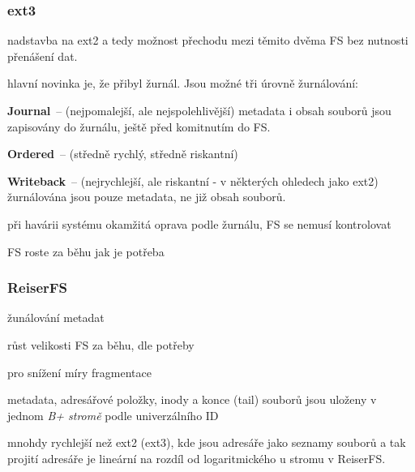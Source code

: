 \subsubsection*{ext3}
\begin{pitemize}
  \item nadstavba na ext2 a tedy možnost přechodu mezi těmito dvěma FS bez
  nutnosti přenášení dat.
  \item hlavní novinka je, že přibyl žurnál. Jsou možné tři úrovně žurnálování:
  \begin{pitemize}
    \item \textbf{Journal}~-- (nejpomalejší, ale nejspolehlivější) metadata i
    obsah souborů jsou zapisovány do žurnálu, ještě před komitnutím do FS.
    \item \textbf{Ordered}~-- (středně rychlý, středně riskantní) 
    \item \textbf{Writeback}~-- (nejrychlejší, ale riskantní - v některých
    ohledech jako ext2) žurnálována jsou pouze metadata, ne již obsah souborů.
  \end{pitemize}
  \item při havárii systému okamžitá oprava podle žurnálu, FS se nemusí kontrolovat
  \item FS roste za běhu jak je potřeba
\end{pitemize}

\subsubsection*{ReiserFS}
\begin{pitemize}
  \item žunálování metadat
  \item růst velikosti FS za běhu, dle potřeby
  \item {} pro snížení míry fragmentace
  \item metadata, adresářové položky, inody a konce (tail) souborů jsou uloženy
  v jednom \emph{B+ stromě} podle univerzálního ID
  \item mnohdy rychlejší než ext2 (ext3), kde jsou adresáře jako seznamy souborů
  a tak projití adresáře je lineární na rozdíl od logaritmického u stromu v ReiserFS.
\end{pitemize}

